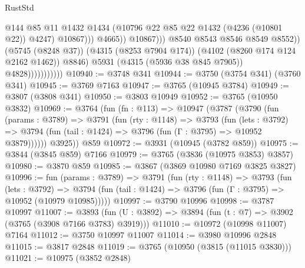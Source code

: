 \begin{lexlean}{RustStd}
\begin{coremodule}
                                                @144
                                                @85
                                                @11
                                                @1432
                                                @1434
                                                (@10796
                                                  @22
                                                  @85
                                                  @22
                                                  @1432
                                                  (@4236 (@10801 @22))
                                                  @4247)
                                                @10867)))
                                          @4665))
                                      @10867)))
                                @8540
                                @8543
                                @8546
                                @8549
                                @8552))
                            (@5745 (@8248 @37))
                            (@4315 (@8253 @7904 @174))
                            (@4102 (@8260 @174 @124 @2162 @1462))
                            @8846)
                          @5931
                          (@4315 (@5936 @38 @845 @7905))
                          @4828)))))))))))
@10940 := @3748 @341
@10944 := @3750 (@3754 @341) (@3760 @341)
@10945 := @3769 @7163
@10947 := @3765 (@10945 @3784)
@10949 := @3807 (@3808 @341)
@10950 := @3803 @10949
@10952 := @3765 (@10950 @3832)
@10969 := @3764
    (fun (fn : @113) =>
    @10947
      (@3787
        (@3790
          (fun (params : @3789) =>
          @3791
            (fun (rty : @1148) =>
            @3793
              (fun (lets : @3792) =>
              @3794 (fun (tail : @1424) => @3796 (fun (Γ : @3795) => @10952 @3879))))))
        @3925))
    @859
@10972 := @3931 (@10945 (@3782 @859))
@10975 := @3844 (@3845 @859) @7166
@10979 := @3765 (@3836 (@10975 @3853) @3857)
@10980 := @3870 @859
@10985 := @3867 (@3869 @10980 @7169 @3825 @3827)
@10996 := fun (params : @3789) =>
  @3791
    (fun (rty : @1148) =>
    @3793
      (fun (lets : @3792) =>
      @3794 (fun (tail : @1424) => @3796 (fun (Γ : @3795) => @10952 (@10979 @10985)))))
@10997 := @3790 @10996
@10998 := @3787 @10997
@11007 := @3893 (fun (U : @3892) => @3894 (fun (t : @7) => @3902 (@3765 (@3908 @7166 @3783) @3919)))
@11010 := @10972 (@10998 @11007) @7164
@11012 := @3750 @10997 @11007
@11014 := @3980 @10996 @2848
@11015 := @3817 @2848
@11019 := @3765 (@10950 (@3815 (@11015 @3830)))
@11021 := @10975 (@3852 @2848)

\end{coremodule}
\end{lexlean}
